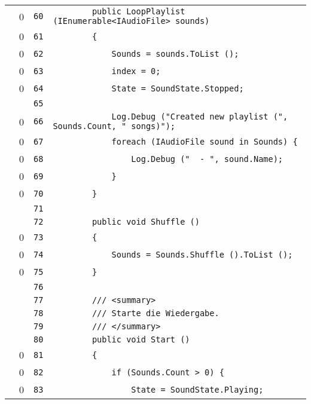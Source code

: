 \documentclass[a4paper,10pt]{article}
\begin{document}
\begin{longtable}[l]{lrrl}
\cellcolor{red} & 0 & \verb~60~ & \verb~        public LoopPlaylist (IEnumerable<IAudioFile> sounds)~\\
\cellcolor{red} & 0 & \verb~61~ & \verb~        {~\\
\cellcolor{red} & 0 & \verb~62~ & \verb~            Sounds = sounds.ToList ();~\\
\cellcolor{red} & 0 & \verb~63~ & \verb~            index = 0;~\\
\cellcolor{red} & 0 & \verb~64~ & \verb~            State = SoundState.Stopped;~\\
\cellcolor{gray} &  & \verb~65~ & \verb~~\\
\cellcolor{red} & 0 & \verb~66~ & \verb~            Log.Debug ("Created new playlist (", Sounds.Count, " songs)");~\\
\cellcolor{red} & 0 & \verb~67~ & \verb~            foreach (IAudioFile sound in Sounds) {~\\
\cellcolor{red} & 0 & \verb~68~ & \verb~                Log.Debug ("  - ", sound.Name);~\\
\cellcolor{red} & 0 & \verb~69~ & \verb~            }~\\
\cellcolor{red} & 0 & \verb~70~ & \verb~        }~\\
\cellcolor{gray} &  & \verb~71~ & \verb~~\\
\cellcolor{gray} &  & \verb~72~ & \verb~        public void Shuffle ()~\\
\cellcolor{red} & 0 & \verb~73~ & \verb~        {~\\
\cellcolor{red} & 0 & \verb~74~ & \verb~            Sounds = Sounds.Shuffle ().ToList ();~\\
\cellcolor{red} & 0 & \verb~75~ & \verb~        }~\\
\cellcolor{gray} &  & \verb~76~ & \verb~~\\
\cellcolor{gray} &  & \verb~77~ & \verb~        /// <summary>~\\
\cellcolor{gray} &  & \verb~78~ & \verb~        /// Starte die Wiedergabe.~\\
\cellcolor{gray} &  & \verb~79~ & \verb~        /// </summary>~\\
\cellcolor{gray} &  & \verb~80~ & \verb~        public void Start ()~\\
\cellcolor{red} & 0 & \verb~81~ & \verb~        {~\\
\cellcolor{red} & 0 & \verb~82~ & \verb~            if (Sounds.Count > 0) {~\\
\cellcolor{red} & 0 & \verb~83~ & \verb~                State = SoundState.Playing;~\\

\end{longtable}
\end{document}

